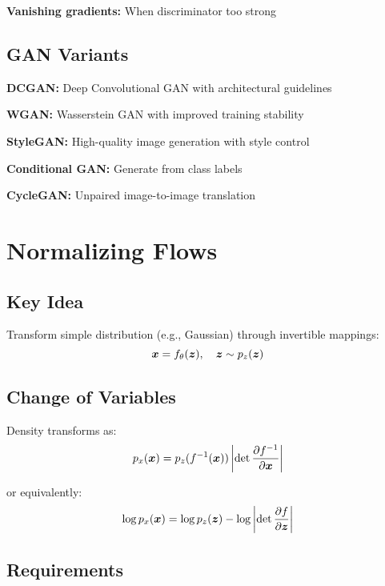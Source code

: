 \textbf{Vanishing gradients:} When discriminator too strong

\subsection{GAN Variants}

\textbf{DCGAN:} Deep Convolutional GAN with architectural guidelines

\textbf{WGAN:} Wasserstein GAN with improved training stability

\textbf{StyleGAN:} High-quality image generation with style control

\textbf{Conditional GAN:} Generate from class labels

\textbf{CycleGAN:} Unpaired image-to-image translation

\section{Normalizing Flows}
\label{sec:normalizing-flows}

\subsection{Key Idea}

Transform simple distribution (e.g., Gaussian) through invertible mappings:
\begin{equation}
\boldsymbol{x} = f_{\theta}(\boldsymbol{z}), \quad \boldsymbol{z} \sim p_z(\boldsymbol{z})
\end{equation}

\subsection{Change of Variables}

Density transforms as:
\begin{equation}
p_x(\boldsymbol{x}) = p_z(f^{-1}(\boldsymbol{x})) \left|\det \frac{\partial f^{-1}}{\partial \boldsymbol{x}}\right|
\end{equation}

or equivalently:
\begin{equation}
\log p_x(\boldsymbol{x}) = \log p_z(\boldsymbol{z}) - \log\left|\det \frac{\partial f}{\partial \boldsymbol{z}}\right|
\end{equation}

\subsection{Requirements}

